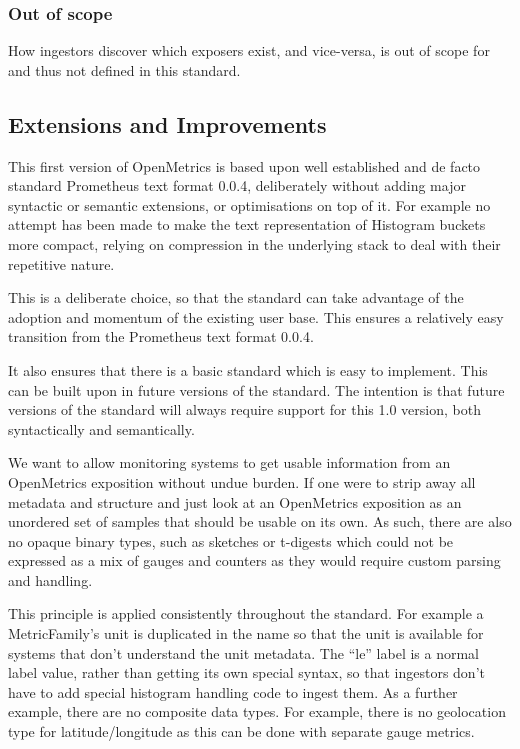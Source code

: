 \documentclass[a4paper,12pt,notitlepage,twoside,openright]{article}
\begin{document}
\hypertarget{out-of-scope}{%
\subsubsection{Out of scope}\label{out-of-scope}}

How ingestors discover which exposers exist, and vice-versa, is out of
scope for and thus not defined in this standard.

\hypertarget{extensions-and-improvements}{%
\subsection{Extensions and
Improvements}\label{extensions-and-improvements}}

This first version of OpenMetrics is based upon well established and de
facto standard Prometheus text format 0.0.4, deliberately without adding
major syntactic or semantic extensions, or optimisations on top of it.
For example no attempt has been made to make the text representation of
Histogram buckets more compact, relying on compression in the underlying
stack to deal with their repetitive nature.

This is a deliberate choice, so that the standard can take advantage of
the adoption and momentum of the existing user base. This ensures a
relatively easy transition from the Prometheus text format 0.0.4.

It also ensures that there is a basic standard which is easy to
implement. This can be built upon in future versions of the standard.
The intention is that future versions of the standard will always
require support for this 1.0 version, both syntactically and
semantically.

We want to allow monitoring systems to get usable information from an
OpenMetrics exposition without undue burden. If one were to strip away
all metadata and structure and just look at an OpenMetrics exposition as
an unordered set of samples that should be usable on its own. As such,
there are also no opaque binary types, such as sketches or t-digests
which could not be expressed as a mix of gauges and counters as they
would require custom parsing and handling.

This principle is applied consistently throughout the standard. For
example a MetricFamily's unit is duplicated in the name so that the unit
is available for systems that don't understand the unit metadata. The
``le'' label is a normal label value, rather than getting its own
special syntax, so that ingestors don't have to add special histogram
handling code to ingest them. As a further example, there are no
composite data types. For example, there is no geolocation type for
latitude/longitude as this can be done with separate gauge metrics.
\end{document}
